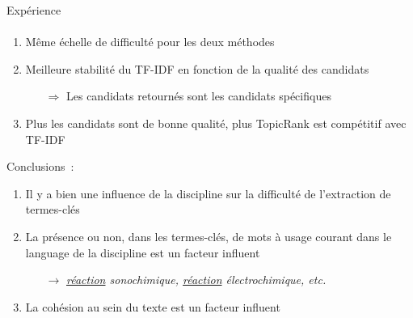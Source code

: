   \begin{frame}{Expérience}
    \framesubtitle{}

    \begin{enumerate}
      \item<2>{Même échelle de difficulté pour les deux méthodes}
      \item<3>{Meilleure stabilité du TF-IDF en fonction de la qualité des
            candidats}
      \begin{itemize}
        \item[$\Rightarrow$]{Les candidats retournés sont les candidats
                             spécifiques}
      \end{itemize}
      \item<4>{Plus les candidats sont de bonne qualité, plus TopicRank est
            compétitif avec TF-IDF}
    \end{enumerate}

    Conclusions~:
    \begin{enumerate}
      \item<2,6>{Il y a bien une influence de la discipline sur la difficulté de
            l'extraction de termes-clés}
      \item<3,6>{La présence ou non, dans les termes-clés, de mots à usage courant dans le language de la
            discipline est un facteur influent}
      \begin{itemize}
        \item[$\rightarrow$]{\textit{\og{}\underline{réaction}
                             sonochimique\fg{}, \og{}\underline{réaction}
                             électrochimique\fg{}, etc.}}
      \end{itemize}
      \item<4->{La cohésion au sein du texte est un facteur influent}
    \end{enumerate}

\end{frame}
